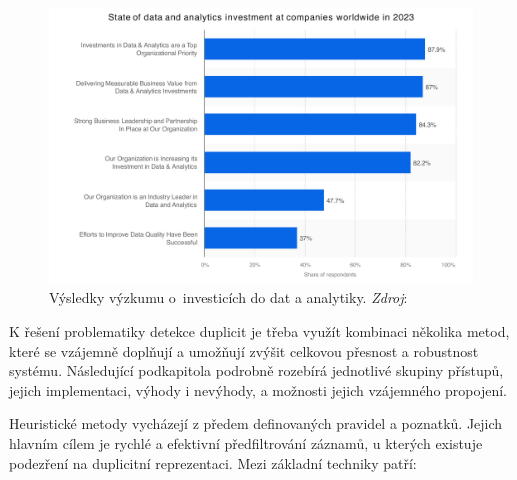 \begin{figure}[htb]
  \centering
  \includegraphics[width=\textwidth]{images/statista-global-state-of-data-and-analytics-investment-2023.pdf}
  \caption{Výsledky výzkumu o~investicích do dat a analytiky. \newline
    \textit{Zdroj}: \cite{newvantage_partners_global_2024}}
  \label{fig:google-trends}
\end{figure}


K řešení problematiky detekce duplicit je třeba využít kombinaci několika metod, které se vzájemně doplňují a umožňují zvýšit celkovou přesnost a robustnost systému. Následující podkapitola podrobně rozebírá jednotlivé skupiny přístupů, jejich implementaci, výhody i nevýhody, a možnosti jejich vzájemného propojení.

Heuristické metody vycházejí z předem definovaných pravidel a poznatků. Jejich hlavním cílem je rychlé a efektivní předfiltrování záznamů, u kterých existuje podezření na duplicitní reprezentaci. Mezi základní techniky patří:


